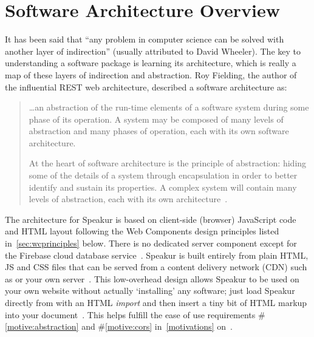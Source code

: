 \section{Software Architecture Overview}
It has been said that ``any problem in computer science can be solved with another layer of indirection'' (usually attributed to David Wheeler).
The key to understanding a software package is learning its architecture,
which is really a map of these layers of indirection and abstraction.
Roy Fielding, the author of the influential REST web architecture, described a software architecture as:

\begin{quote}
\dots an abstraction of the run-time elements of a software system during some phase of its operation. A system may be composed of many levels of abstraction and many phases of operation, each with its own software architecture.

At the heart of software architecture is the principle of abstraction: hiding some of the details of a system through encapsulation in order to better identify and sustain its properties. A complex system will contain many levels of abstraction, each with its own architecture~\cite{fielding2000}.
\end{quote}

The architecture for Speakur is based on client-side (browser) JavaScript code and HTML layout following the Web Components design principles listed in~\cref{sec:wcprinciples} below. 
There is no dedicated server component except for the Firebase cloud database service~\cite{firebasecontributors2015}.
Speakur is built entirely from plain HTML, JS and CSS files that can be served from a content delivery network (CDN) 
such as  or your own server~\cite{landers2015-d}.
This low-overhead design allows Speakur to be used on your own website without actually `installing' any software;
just load Speakur directly from  with an HTML \textit{import}
and then insert a tiny bit of HTML markup into your document~\cite{landers2015-d}.
This helps fulfill the ease of use requirements 
\#\ref{motive:abstraction} and \#\ref{motive:cors}
in~\cref{motivations} on~.

